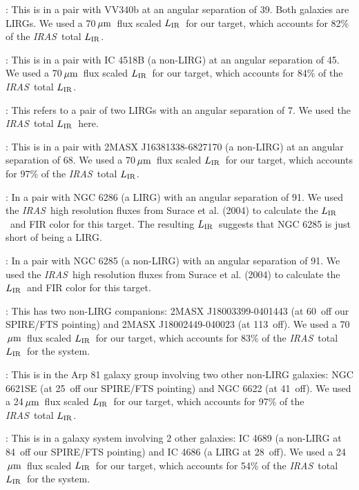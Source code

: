 \documentclass[preprint]{aastex}
\newcommand{\um}{\mbox{$\,\mu{\rm m}$}}
\newcommand{\IRAS}{{\it IRAS}}
\newcommand{\LIR}{\mbox{$L_{\rm IR}$}}
\begin{document}
: This is in a pair with VV340b at an angular separation of 39\arcsec. Both galaxies are LIRGs.  We used a 70\um\ flux 
	  scaled \LIR\ for our target, which accounts for 82\% of the \IRAS\ total \LIR.

: This is in a pair with IC 4518B (a non-LIRG) at an angular separation of 45\arcsec. We used 
	     a 70\um\ flux scaled \LIR\ for our target, which accounts for 84\% of the \IRAS\ total \LIR.

: This refers to a pair of two LIRGs with an angular separation of 7\arcsec.  We used the \IRAS\ total \LIR\ here.

: This is in a pair with 2MASX J16381338-6827170 (a non-LIRG) at an angular separation of 68\arcsec. 
		We used a 70\um\ flux scaled \LIR\ for our target, which accounts for 97\% of the \IRAS\ total \LIR.

: In a pair with NGC 6286 (a LIRG) with an angular separation of 91\arcsec. We used the \IRAS\ high resolution fluxes
          from Surace et al. (2004) to calculate the \LIR\ and FIR color for this target.
	  The resulting \LIR\ suggests that NGC 6285 is just short of being a LIRG.

: In a pair with NGC 6285 (a non-LIRG) with an angular separation of 91\arcsec. We used the \IRAS\ high 
	    resolution fluxes from Surace et al. (2004) to calculate the \LIR\ and FIR color for this target.

: This has two non-LIRG companions: 2MASX J18003399-0401443 (at 60\arcsec\ off our SPIRE/FTS pointing) 
	    and 2MASX J18002449-040023 (at 113\arcsec\ off).  We used a 70\um\ flux scaled \LIR\ for our target, which accounts for 
	    83\% of the \IRAS\ total \LIR\ for the system.

: This is in the Arp 81 galaxy group involving two other non-LIRG galaxies: NGC 6621SE (at 25\arcsec\ 
	   off our SPIRE/FTS pointing)
	  and NGC 6622 (at 41\arcsec\ off).  We used a 24\um\ flux scaled \LIR\ for our target, which accounts for 97\% of 
	   the \IRAS\ total \LIR.

: This is in a galaxy system involving 2 other galaxies: IC 4689 (a non-LIRG at 84\arcsec\ off our 
	    SPIRE/FTS pointing) and 
          IC 4686 (a LIRG at 28\arcsec\ off). We used a 24\um\ flux scaled \LIR\ for our target, which accounts for 54\% of 
	    the \IRAS\ total \LIR\ for the system.
\end{document}
